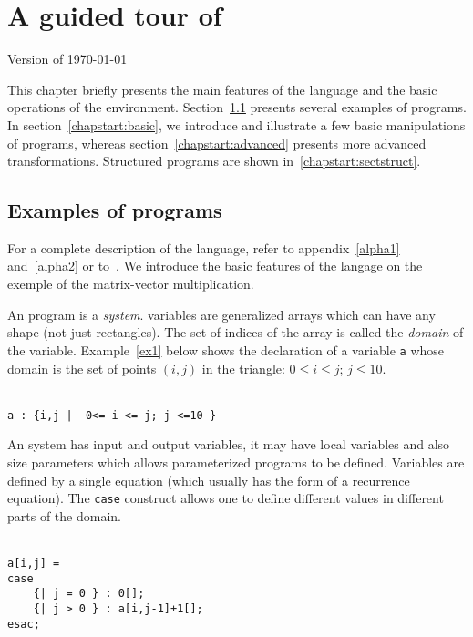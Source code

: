 \chapter{A guided tour of \alfa{}}
\label{chapstart}

{\sc Version of \today}

This chapter briefly presents the main features of the \alfa{} 
language and the basic operations of the \mmalfa{} environment.
Section~\ref{chapstart:examples} presents several examples of 
\alfa{} programs. In section~\ref{chapstart:basic}, we introduce
and illustrate a few basic manipulations of \alfa{} programs, 
whereas section~\ref{chapstart:advanced} presents more advanced
transformations. Structured programs are shown in~\ref{chapstart:sectstruct}.


\section{Examples of {\Alpha} programs}
\label{chapstart:examples}
For a complete description of the {\Alpha} language, refer to
appendix~\ref{alpha1} and~\ref{alpha2} or
to~\cite{wilde-tech94,Mauras89,DupontQuRi95}. We introduce the basic
features of the langage on the exemple of the matrix-vector
multiplication.

An {\Alpha} program is a {\em system}. \alfa{} variables are generalized
arrays which can have any shape (not just rectangles).  The set of
indices of the array is called the {\em domain} of the variable.
Example~\ref{ex1} below shows the declaration of a variable {\tt a}
whose domain is  the set of points $(i,j)$ in the triangle:  $0 \leq i \leq j$;
$j \leq 10$.

\begin{ex}
~\\
\texttt{a : \{i,j~|~ 0<= i <= j; j <=10 \} }
\label{ex1}
\end{ex} 

An \alfa{} system has input and output variables, it may have local
variables and also size parameters which allows parameterized programs
to be defined.  Variables are defined by a single equation (which
usually has the form of a recurrence equation). The {\tt case}
construct allows one to define different values in different parts of
the domain.

\begin{ex}
\texttt{
\\
a[i,j] = \\
case\\
\ \ \ \ \{| j = 0 \} : 0[];\\
\ \ \ \   \{| j > 0 \} : a[i,j-1]+1[];\\
         esac;
}
\label{ex2} 
\end{ex}

